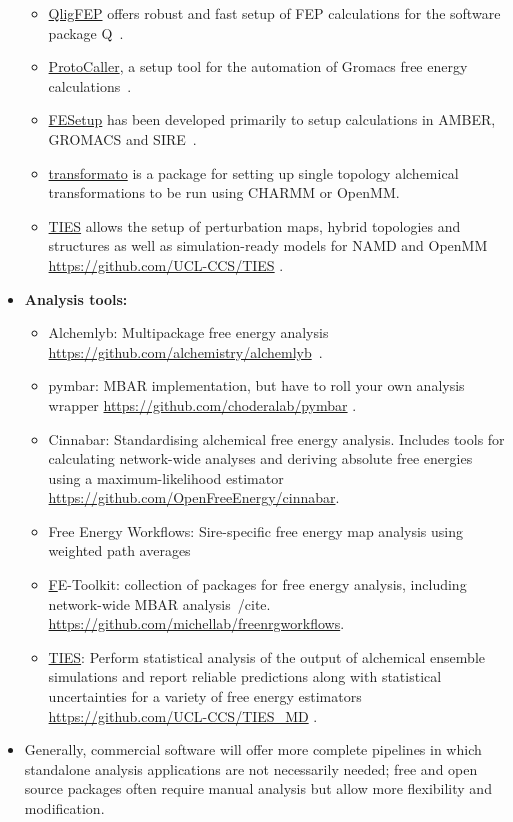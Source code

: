 \documentclass[9pt,bestpractices]{livecoms}
\begin{document}
\begin{itemize}
\begin{itemize}
	\item \href{https://github.com/qusers/qligfep}{QligFEP} offers robust and fast setup of FEP calculations for the software package Q~\cite{jespers2019qligfep}.
	\item \href{https://github.com/protocaller/ProtoCaller}{ProtoCaller}, a setup tool for the automation of Gromacs free energy calculations~\cite{suruzhon2020protocaller}.
	\item \href{https://fesetup.readthedocs.io/en/latest/introduction.html}{FESetup} has been developed primarily to setup calculations in AMBER, GROMACS and SIRE~\cite{loeffler2015fesetup}.
        \item 
    \href{https://github.com/cbc-univie/transformato}{transformato} is a package for setting up single topology alchemical transformations to be run using CHARMM or OpenMM.
    \item \href{http://www.ties-service.org}{TIES} allows the setup of perturbation maps, hybrid topologies and structures as well as simulation-ready models for NAMD and OpenMM \url{https://github.com/UCL-CCS/TIES} \cite{bieniek2023}.
	\end{itemize}
\item []\textbf{Analysis tools:}
	\begin{itemize}

	\item Alchemlyb: Multipackage free energy analysis
	\url{https://github.com/alchemistry/alchemlyb}~\cite{daviddotson2020alchemistry}.
	\item pymbar: MBAR implementation, but have to roll your own analysis wrapper      
	\url{https://github.com/choderalab/pymbar} \cite{shirts2008statisticallya}.
	\item Cinnabar: Standardising alchemical free energy analysis. Includes tools for calculating network-wide analyses and deriving absolute free energies using a maximum-likelihood estimator \url{https://github.com/OpenFreeEnergy/cinnabar}.
	\item Free Energy Workflows: Sire-specific free energy map analysis using weighted path averages 
        \item \href{https://gitlab.com/RutgersLBSR/fe-toolkit} FE-Toolkit: collection of packages for free energy analysis, including network-wide MBAR analysis~/cite{}.
    \url{https://github.com/michellab/freenrgworkflows}.
    \item \href{http://www.ties-service.org}{TIES}: Perform statistical analysis of the output of alchemical ensemble simulations and report reliable predictions along with statistical uncertainties for a variety of free energy estimators \url{https://github.com/UCL-CCS/TIES_MD} \cite{bieniek2023}.
	\end{itemize}
\item[] Generally, commercial software will offer more complete pipelines in which standalone analysis applications are not necessarily needed; free and open source packages often require manual analysis but allow more flexibility and modification.
\end{itemize}
\end{document}
